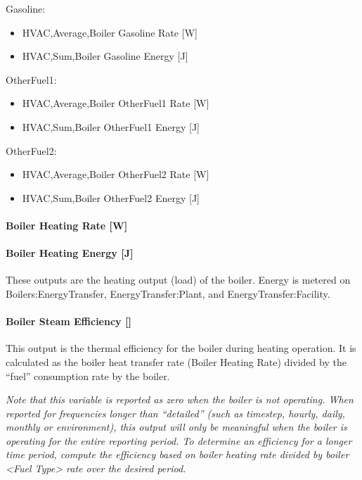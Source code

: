 Gasoline:

\begin{itemize}
    \item
    HVAC,Average,Boiler Gasoline Rate {[}W{]}
    \item
    HVAC,Sum,Boiler Gasoline Energy {[}J{]}
\end{itemize}

OtherFuel1:

\begin{itemize}
    \item
    HVAC,Average,Boiler OtherFuel1 Rate {[}W{]}
    \item
    HVAC,Sum,Boiler OtherFuel1 Energy {[}J{]}
\end{itemize}

OtherFuel2:

\begin{itemize}
    \item
    HVAC,Average,Boiler OtherFuel2 Rate {[}W{]}
    \item
    HVAC,Sum,Boiler OtherFuel2 Energy {[}J{]}
\end{itemize}

\paragraph{Boiler Heating Rate {[}W{]}}\label{boiler-heating-rate-w-1}

\paragraph{Boiler Heating Energy {[}J{]}}\label{boiler-heating-energy-j-1}

These outputs are the heating output (load) of the boiler. Energy is metered on Boilers:EnergyTransfer, EnergyTransfer:Plant, and EnergyTransfer:Facility.

\paragraph{Boiler Steam Efficiency {[]}}\label{boiler-steam-efficiency}

This output is the thermal efficiency for the boiler during heating operation. It is calculated as the boiler heat transfer rate (Boiler Heating Rate) divided by the ``fuel'' consumption rate by the boiler.

\emph{Note that this variable is reported as zero when the boiler is not operating. When reported for frequencies longer than ``detailed'' (such as timestep, hourly, daily, monthly or environment), this output will only be meaningful when the boiler is operating for the entire reporting period. To determine an efficiency for a longer time period, compute the efficiency based on boiler heating rate divided by boiler \textless{}Fuel Type\textgreater{} rate over the desired period.}

